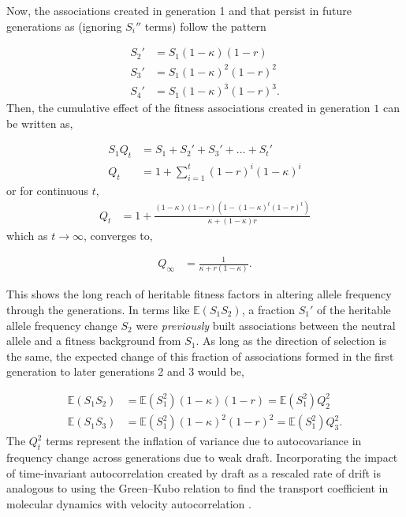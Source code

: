 \documentclass[11pt]{article}
\newcommand{\E}{\mathbb{E}}
\begin{document}
Now, the associations created in generation 1 and that persist in future
generations as (ignoring $S_i''$ terms) follow the pattern

\begin{align}
  S_{2}' &= S_1 (1-\kappa)(1-r) \nonumber \\
  S_{3}' &= S_1 (1-\kappa)^2(1-r)^2 \nonumber \\
  S_{4}' &= S_1 (1-\kappa)^3(1-r)^3.
\end{align}
%
Then, the cumulative effect of the fitness associations created in generation
$1$ can be written as,

\begin{align}
  \label{eq:qterm}
  S_1 Q_t &= S_1 + S_2' + S_3' + \ldots + S_t' \nonumber \\
  Q_t &= 1 + \sum_{i=1}^t (1-r)^i(1-\kappa)^i
\end{align}
%
or for continuous $t$, 
%
\begin{align}
  \label{eq:q_t}
  Q_t &= 1+\frac{(1-\kappa) (1-r) \left(1-(1-\kappa)^t (1-r)^t\right)}{\kappa+(1-\kappa)r}
\end{align}
which as $t \to \infty$, converges to,

\begin{align}
  \label{supp-eq:Qinf}
  Q_\infty &= \frac{1}{\kappa + r(1-\kappa)}.
\end{align}

This shows the long reach of heritable fitness factors in altering allele
frequency through the generations. In terms like $\E(S_1 S_2)$, a fraction
$S_1'$ of the heritable allele frequency change $S_2$ were \emph{previously}
built associations between the neutral allele and a fitness background from
$S_1$. As long as the direction of selection is the same, the expected change
of this fraction of associations formed in the first generation to later
generations 2 and 3 would be,

\begin{align}
  \E(S_1 S_2) &= \E(S_1^2) (1-\kappa)(1-r) = \E(S_1^2) Q_2^2 \nonumber \\
  \E(S_1 S_3) &= \E(S_1^2) (1-\kappa)^2(1-r)^2 = \E(S_1^2) Q_3^2.
\end{align}
%
The $Q_t^2$ terms represent the inflation of variance due to autocovariance in
frequency change across generations due to weak draft. Incorporating the impact
of time-invariant autocorrelation created by draft as a rescaled rate of drift
is analogous to using the Green--Kubo relation to find the transport
coefficient in molecular dynamics with velocity autocorrelation
\parencite{Green1954-kl,Kubo1957-va}.
\end{document}

